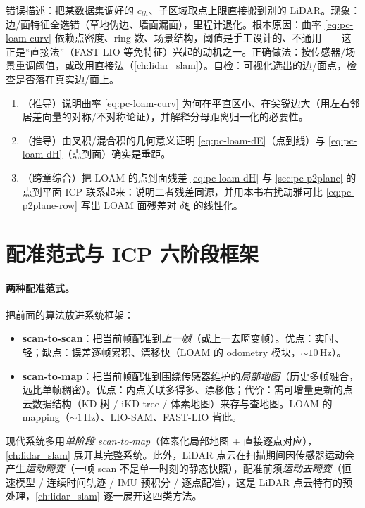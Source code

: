 \begin{pitfall}
错误描述：把某数据集调好的 $c_{th}$、子区域取点上限直接搬到别的 LiDAR。现象：边/面特征全选错（草地伪边、墙面漏面），里程计退化。根本原因：曲率 \cref{eq:pc-loam-curv} 依赖点密度、ring 数、场景结构，阈值是手工设计的、不通用——这正是“直接法”（FAST-LIO 等免特征）兴起的动机之一。正确做法：按传感器/场景重调阈值，或改用直接法（\cref{ch:lidar_slam}）。自检：可视化选出的边/面点，检查是否落在真实边/面上。
\end{pitfall}

\begin{practice}
\begin{enumerate}
  \item （推导）说明曲率 \cref{eq:pc-loam-curv} 为何在平直区小、在尖锐边大（用左右邻居差向量的对称/不对称论证），并解释分母距离归一化的必要性。
  \item （推导）由叉积/混合积的几何意义证明 \cref{eq:pc-loam-dE}（点到线）与 \cref{eq:pc-loam-dH}（点到面）确实是垂距。
  \item （跨章综合）把 LOAM 的点到面残差 \cref{eq:pc-loam-dH} 与 \cref{sec:pc-p2plane} 的点到平面 ICP 联系起来：说明二者残差同源，并用本书右扰动雅可比 \cref{eq:pc-p2plane-row} 写出 LOAM 面残差对 $\delta\boldsymbol{\xi}$ 的线性化。
\end{enumerate}
\end{practice}

\section{配准范式与 ICP 六阶段框架}
\label{sec:pc-paradigm}

\paragraph{两种配准范式。}
把前面的算法放进系统框架\cite{carlone2026handbook,zhang2014loam}：
\begin{itemize}
  \item \textbf{scan-to-scan}：把当前帧配准到\emph{上一帧}（或上一去畸变帧）。优点：实时、轻；缺点：误差逐帧累积、漂移快（LOAM 的 odometry 模块，$\sim10\,\mathrm{Hz}$）。
  \item \textbf{scan-to-map}：把当前帧配准到围绕传感器维护的\emph{局部地图}（历史多帧融合，远比单帧稠密）。优点：内点关联多得多、漂移低；代价：需可增量更新的点云数据结构（KD 树 / iKD-tree / 体素地图）来存与查地图。LOAM 的 mapping（$\sim1\,\mathrm{Hz}$）、LIO-SAM、FAST-LIO 皆此。
\end{itemize}
现代系统多用\emph{单阶段 scan-to-map}（体素化局部地图 + 直接逐点对应），\cref{ch:lidar_slam} 展开其完整系统。此外，LiDAR 点云在扫描期间因传感器运动会产生\emph{运动畸变}（一帧 scan 不是单一时刻的静态快照），配准前须\emph{运动去畸变}（恒速模型 / 连续时间轨迹 / IMU 预积分 / 逐点配准），这是 LiDAR 点云特有的预处理，\cref{ch:lidar_slam} 逐一展开这四类方法。

